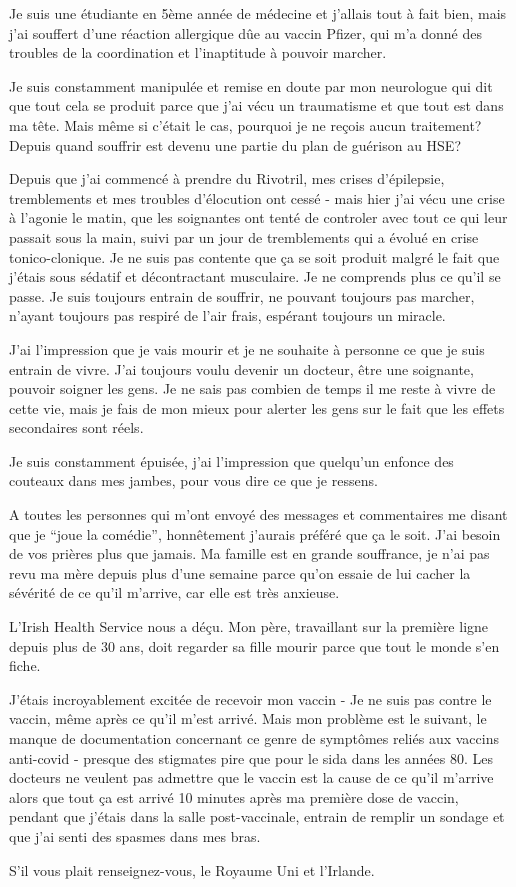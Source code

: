 Je suis une étudiante en 5ème année de médecine et j'allais tout à fait bien,
mais j'ai souffert d'une réaction allergique dûe au vaccin Pfizer, qui m'a donné
des troubles de la coordination et l'inaptitude à pouvoir marcher.

Je suis constamment manipulée et remise en doute par mon neurologue qui dit que
tout cela se produit parce que j'ai vécu un traumatisme et que tout est dans ma
tête. Mais même si c'était le cas, pourquoi je ne reçois aucun traitement?
Depuis quand souffrir est devenu une partie du plan de guérison au HSE?

Depuis que j'ai commencé à prendre du Rivotril, mes crises d'épilepsie,
tremblements et mes troubles d'élocution ont cessé - mais hier j'ai vécu une
crise à l'agonie le matin, que les soignantes ont tenté de controler avec tout
ce qui leur passait sous la main, suivi par un jour de tremblements qui a évolué
en crise tonico-clonique. Je ne suis pas contente que ça se soit produit malgré
le fait que j'étais sous sédatif et décontractant musculaire. Je ne comprends
plus ce qu'il se passe. Je suis toujours entrain de souffrir, ne pouvant
toujours pas marcher, n'ayant toujours pas respiré de l'air frais, espérant
toujours un miracle.

J'ai l'impression que je vais mourir et je ne souhaite à personne ce que je suis
entrain de vivre. J'ai toujours voulu devenir un docteur, être une soignante,
pouvoir soigner les gens. Je ne sais pas combien de temps il me reste à vivre de
cette vie, mais je fais de mon mieux pour alerter les gens sur le fait que les
effets secondaires sont réels.

Je suis constamment épuisée, j'ai l'impression que quelqu'un enfonce des
couteaux dans mes jambes, pour vous dire ce que je ressens.

A toutes les personnes qui m'ont envoyé des messages et commentaires me disant
que je “joue la comédie”, honnêtement j'aurais préféré que ça le soit. J'ai
besoin de vos prières plus que jamais. Ma famille est en grande souffrance, je
n'ai pas revu ma mère depuis plus d'une semaine parce qu'on essaie de lui cacher
la sévérité de ce qu'il m'arrive, car elle est très anxieuse.

L'Irish Health Service nous a déçu. Mon père, travaillant sur la première ligne
depuis plus de 30 ans, doit regarder sa fille mourir parce que tout le monde
s'en fiche.

J'étais incroyablement excitée de recevoir mon vaccin - Je ne suis pas contre le
vaccin, même après ce qu'il m'est arrivé. Mais mon problème est le suivant, le
manque de documentation concernant ce genre de symptômes reliés aux vaccins
anti-covid - presque des stigmates pire que pour le sida dans les années 80. Les
docteurs ne veulent pas admettre que le vaccin est la cause de ce qu'il m'arrive
alors que tout ça est arrivé 10 minutes après ma première dose de vaccin,
pendant que j'étais dans la salle post-vaccinale, entrain de remplir un sondage
et que j'ai senti des spasmes dans mes bras.

S'il vous plait renseignez-vous, le Royaume Uni et l'Irlande.
